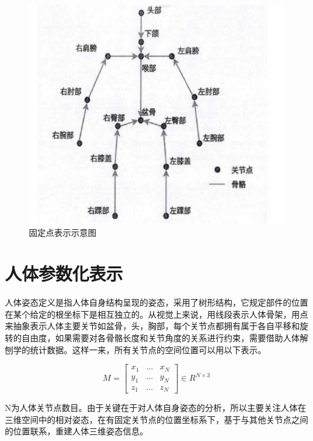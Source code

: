 \begin{figure}[h]
	\includegraphics[width=\textwidth]{pic/human_pose_2.jpg}
	\caption{固定点表示示意图}
	\label{human_pose_2}
\end{figure}

\section{人体参数化表示}

人体姿态定义是指人体自身结构呈现的姿态，采用了树形结构，它规定部件的位置在某个给定的根坐标下是相互独立的。从视觉上来说，用线段表示人体骨架，用点来抽象表示人体主要关节如盆骨，头，胸部，每个关节点都拥有属于各自平移和旋转的自由度，如果需要对各骨骼长度和关节角度的关系进行约束，需要借助人体解刨学的统计数据。这样一来，所有关节点的空间位置可以用以下表示。

\begin{equation}
M = \left[ {\begin{array}{*{20}{c}}
{{x_1}}&{...}&{{x_N}}\\
{{y_1}}&{...}&{{y_N}}\\
{{z_1}}&{...}&{{z_N}}
\end{array}} \right] \in {R^{N \times 3}}
\end{equation}

N为人体关节点数目。由于关键在于对人体自身姿态的分析，所以主要关注人体在三维空间中的相对姿态，在有固定关节点的位置坐标系下，基于与其他关节点之间的位置联系，重建人体三维姿态信息。

